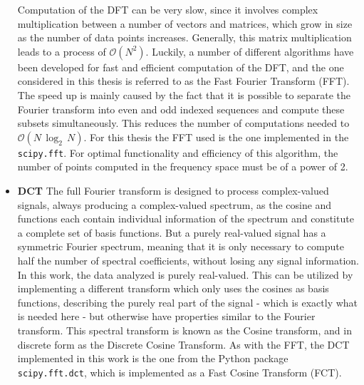 \documentclass[../../CompleteThesis2/Complete_2ndDraft]{subfiles}
\begin{document}
\begin{itemize}
	Computation of the DFT can be very slow, since it involves complex multiplication between a number of vectors and matrices, which grow in size as the number of data points increases. Generally, this matrix multiplication leads to a process of $\mathcal{O}(N^2)$. Luckily, a number of different algorithms have been developed for fast and efficient computation of the DFT, and the one considered in this thesis is referred to as the Fast Fourier Transform (FFT). The speed up is mainly caused by the fact that it is possible to separate the Fourier transform into even and odd indexed sequences and compute these subsets simultaneously. This reduces the number of computations needed to $\mathcal{O}(N\,\log_2\, N)$. For this thesis the FFT used is the one implemented in the \lstinline[language=python]|scipy.fft|. For optimal functionality and efficiency of this algorithm, the number of points computed in the frequency space must be of a power of 2.
	
	\item \textbf{DCT} The full Fourier transform is designed to process complex-valued signals, always producing a complex-valued spectrum, as the cosine and functions each contain individual information of the spectrum and constitute a complete set of basis functions. But a purely real-valued signal has a symmetric Fourier spectrum, meaning that it is only necessary to compute	half the number of spectral coefficients, without losing any signal information. In this work, the data analyzed is purely real-valued. This can be utilized by implementing a different transform which only uses the cosines as basis functions, describing the purely real part of the signal - which is exactly what is needed here - but otherwise have properties similar to the Fourier transform. This spectral transform is known as the Cosine transform, and in discrete form as the Discrete Cosine Transform. As with the FFT, the DCT implemented in this work is the one from the Python package \lstinline[language=python]|scipy.fft.dct|, which is implemented as a Fast Cosine Transform (FCT).
	

\end{itemize}
\end{document}
